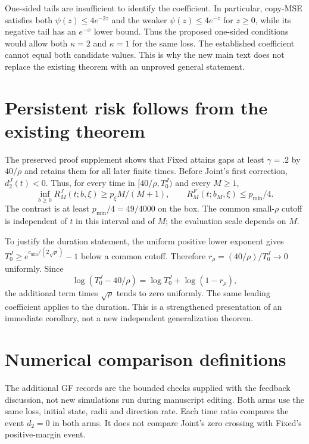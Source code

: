 \documentclass[10pt,a4paper]{article}
\begin{document}
One-sided tails are insufficient to identify the coefficient. In particular, copy-MSE satisfies both $\psi(z)\le4e^{-2z}$ and the weaker $\psi(z)\le4e^{-z}$ for $z\ge0$, while its negative tail has an $e^{-x}$ lower bound. Thus the proposed one-sided conditions would allow both $\kappa=2$ and $\kappa=1$ for the same loss. The established coefficient cannot equal both candidate values. This is why the new main text does not replace the existing theorem with an unproved general statement.

\section{Persistent risk follows from the existing theorem}
The preserved proof supplement shows that Fixed attains gaps at least $\gamma=.2$ by $40/\rho$ and retains them for all later finite times. Before Joint's first correction, $d_2^J(t)<0$. Thus, for every time in $[40/\rho,T_0^J)$ and every $M\ge1$,
\[
\inf_{b\ge0}R_M^J(t;b,\xi)\ge p_\xi M/(M+1),\qquad
R_M^F(t;b_M,\xi)\le p_{\min}/4.
\]
The contrast is at least $p_{\min}/4=49/4000$ on the box. The common small-$\rho$ cutoff is independent of $t$ in this interval and of $M$; the evaluation scale depends on $M$.

To justify the duration statement, the uniform positive lower exponent gives $T_0^J\ge e^{c_{\min}/(2\sqrt\rho)}-1$ below a common cutoff. Therefore $r_\rho=(40/\rho)/T_0^J\to0$ uniformly. Since
\[
\log(T_0^J-40/\rho)=\log T_0^J+\log(1-r_\rho),
\]
the additional term times $\sqrt\rho$ tends to zero uniformly. The same leading coefficient applies to the duration. This is a strengthened presentation of an immediate corollary, not a new independent generalization theorem.

\section{Numerical comparison definitions}
The additional GF records are the bounded checks supplied with the feedback discussion, not new simulations run during manuscript editing. Both arms use the same loss, initial state, radii and direction rate. Each time ratio compares the event $d_2=0$ in both arms. It does not compare Joint's zero crossing with Fixed's positive-margin event.
\end{document}
